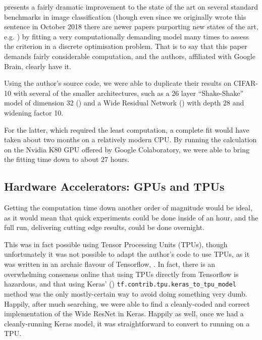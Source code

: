 \documentclass[10pt,twocolumn,letterpaper]{article}
\begin{document}
  \cite{Cubuk2018} presents a fairly dramatic improvement to the state of the art on several standard benchmarks in image classification (though even since we originally wrote this sentence in October 2018 there are newer papers purporting new states of the art, e.g. \cite{Ho2018}) by fitting a very computationally demanding model many times to assess the criterion in a discrete optimisation problem. That is to say that this paper demands fairly considerable computation, and the authors, affiliated with Google Brain, clearly have it.

  Using the author's source code, we were able to duplicate their results on CIFAR-10 with several of the smaller architectures, such as a 26 layer ``Shake-Shake'' model of dimension 32 (\cite{Gastaldi2017}) and a Wide Residual Network (\cite{Zagoruyko2016}) with depth 28 and widening factor 10.

  For the latter, which required the least computation, a complete fit would have taken about two months on a relatively modern CPU. By running the calculation on the Nvidia K80 GPU offered by Google Colaboratory, we were able to bring the fitting time down to about 27 hours.

  \subsection{Hardware Accelerators: GPUs and TPUs}
    Getting the computation time down another order of magnitude would be ideal, as it would mean that quick experiments could be done inside of an hour, and the full run, delivering cutting edge results, could be done overnight.

    This was in fact possible using Tensor Processing Units (TPUs), though unfortunately it was not possible to adapt the \cite{Cubuk2018} author's code to use TPUs, as it was written in an archaic flavour of Tensorflow, \cite{Abadi2016}. In fact, there is an overwhelming consensus online that using TPUs directly from Tensorflow is hazardous, and that using Keras' (\cite{Chollet2015}) \texttt{tf.contrib.tpu.keras\_to\_tpu\_model} method was the only mostly-certain way to avoid doing something very dumb. Happily, after much searching, we were able to find a cleanly-coded and correct implementation of the Wide ResNet in Keras. Happily as well, once we had a cleanly-running Keras model, it was straightforward to convert to running on a TPU.
\end{document}
